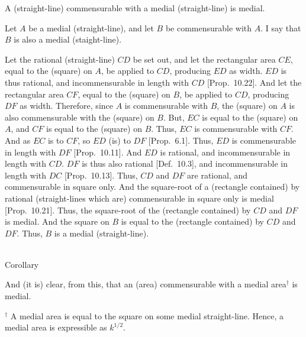 \begin{Parallel}{}{}
{A (straight-line) commensurable with
a medial (straight-line) is medial.

Let $A$ be a medial (straight-line), and let $B$ be commensurable with $A$.
I say that $B$ is also a medial (staight-line).

Let the rational (straight-line) $CD$ be set out, and let the rectangular
area $CE$, equal to the (square) on $A$, be applied to $CD$,
producing $ED$ as width. $ED$ is thus rational, and incommensurable
in length with $CD$ [Prop.~10.22]. And
let the rectangular area $CF$, equal to the (square) on $B$, be
applied to $CD$, producing $DF$ as width.
Therefore, since $A$ is commensurable with $B$, the (square) on $A$
is also commensurable with the (square) on $B$.  But, $EC$ is equal
to the (square) on $A$, and $CF$ is equal to the (square) on $B$. Thus,
$EC$ is commensurable with $CF$. And as $EC$ is to $CF$, so $ED$ (is)
to $DF$ [Prop.~6.1]. Thus, $ED$ is commensurable
in  length with $DF$ [Prop.~10.11]. And $ED$
is rational, and incommensurable in length with $CD$.  $DF$ is thus
 also rational [Def.~10.3], and incommensurable in length with $DC$  [Prop.~10.13]. Thus,
 $CD$ and $DF$ are rational, and commensurable in square only.
 And the square-root of a (rectangle contained) by rational (straight-lines which are)
 commensurable in square only is medial [Prop.~10.21]. Thus, the square-root of the
 (rectangle contained) by $CD$ and $DF$ is medial.
 And the square on $B$ is equal to
 the (rectangle contained) by $CD$ and $DF$. Thus, $B$ is a medial (straight-line).
 
\epsfysize=2.1in
\centerline{}
 
\begin{center}~\\
 {\large Corollary}
 \end{center}\vspace*{-7pt}
 
 And (it is) clear, from this, that an (area) commensurable with a medial 
 area$^\dag$ is medial.}
\end{Parallel}
{\footnotesize\noindent$^\dag$ A medial area is equal to the square on some medial straight-line. Hence, a medial area is expressible as $k^{1/2}$.}
 

